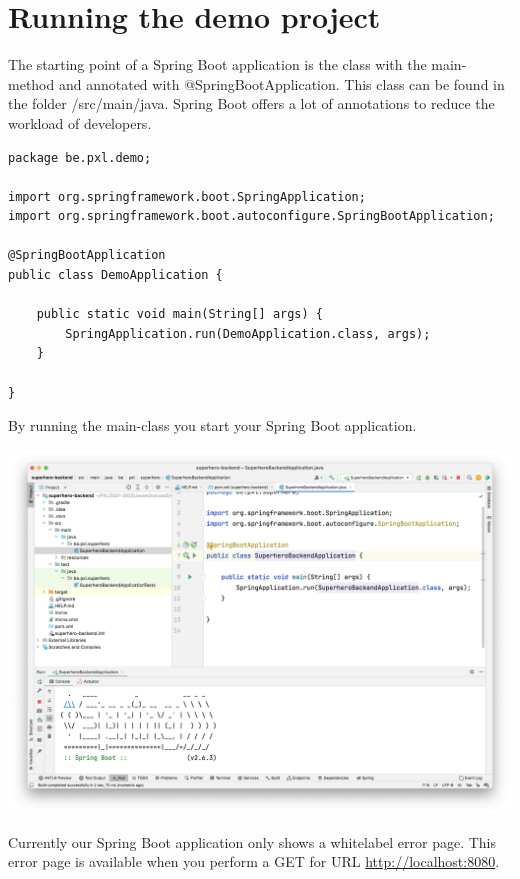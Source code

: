 \section{Running the demo project}

The starting point of a Spring Boot application is the class with the main-method and annotated with @SpringBootApplication.  This class can be found in the folder /src/main/java.  Spring Boot offers a lot of annotations to reduce the workload of developers.   

\begin{lstlisting}[frame=single]
package be.pxl.demo;

import org.springframework.boot.SpringApplication;
import org.springframework.boot.autoconfigure.SpringBootApplication;

@SpringBootApplication
public class DemoApplication {

    public static void main(String[] args) {
        SpringApplication.run(DemoApplication.class, args);
    }

}
\end{lstlisting}

By running the main-class you start your Spring Boot application. 

\includegraphics[width=\textwidth]{./images/chapter2/first-run.png}

Currently our Spring Boot application only shows a whitelabel error page. This error page is available when you perform a GET for URL \url{http://localhost:8080}.


